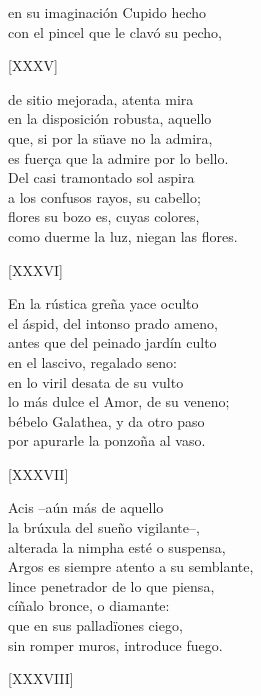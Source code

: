 \documentclass[11pt,a4paper,twoside]{article}
\begin{document}
en su imaginación Cupido hecho\\
con el pincel que le clavó su pecho,\par\pend
%
\begin{center}
	[XXXV]
\end{center}\pstart
de sitio mejorada, atenta mira\\
en la disposición robusta, aquello\\
que, si por la süave no la admira,\\
es fuerça que la admire por lo bello.\\
Del casi tramontado sol aspira\\
a los confusos rayos, su cabello;\\
flores su bozo es, cuyas colores,\\
como duerme la luz, niegan las flores.\par\pend
\relax
\vfill
\newpage
%
\begin{center}
	[XXXVI]
\end{center}\pstart
En la rústica greña yace oculto\\
el áspid, del intonso prado ameno,\\
antes que del peinado jardín culto\\
en el lascivo, regalado seno:\\
en lo viril desata de su vulto\\
lo más dulce el Amor, de su veneno;\\
bébelo Galathea, y da otro paso\\
por apurarle la ponzoña al vaso.\par\pend
%
\begin{center}
	[XXXVII]
\end{center}\pstart
Acis --aún más de aquello \\
la brúxula del sueño vigilante--,\\
alterada la nimpha esté o suspensa,\\
Argos es siempre atento a su semblante,\\
lince penetrador de lo que piensa,\\
cíñalo bronce, o  diamante:\\
que en sus palladïones  ciego,\\
sin romper muros, introduce fuego.\par\pend 
%
\begin{center}
	[XXXVIII]
\end{center}\pstart
\end{document}
